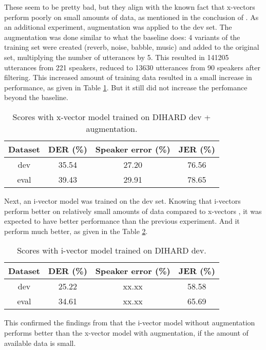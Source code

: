 		These seem to be pretty bad, but they align with the known fact that x-vectors perform poorly on small amounts of data, as mentioned in the conclusion of \cite{huang2018jhu}. As an additional experiment, augmentation was applied to the dev set. The augmentation was done similar to what the baseline does: 4 variants of the training set were created (reverb, noise, babble, music) and added to the original set, multiplying the number of utterances by 5. This resulted in 141205 utterances from 221 speakers, reduced to 13630 utterances from 90 speakers after filtering. This increased amount of training data resulted in a small increase in performance, as given in Table \ref{table-dev-xvec-aug}. But it still did not increase the perfomance beyond the baseline.
		
		\begin{table}[h]
			\centering
			\begin{tabular}{|c|c|c|c|}
				\hline
				Dataset & DER (\%) & Speaker error (\%) & JER (\%) \\
				\hline
				dev & 35.54 & 27.20 & 76.56 \\
				\hline
				eval & 39.43 & 29.91 & 78.65 \\
				\hline
			\end{tabular}
			\caption{Scores with x-vector model trained on DIHARD dev + augmentation.}
			\label{table-dev-xvec-aug}
		\end{table}
	
		Next, an i-vector model was trained on the dev set. Knowing that i-vectors perform better on relatively small amounts of data compared to x-vectors \cite{huang2018jhu}, it was expected to have better performance than the previous experiment. And it perform much better, as given in the Table \ref{table-dev-ivec}.
		
		\begin{table}[h]
			\centering
			\begin{tabular}{|c|c|c|c|}
				\hline
				Dataset & DER (\%) & Speaker error (\%) & JER (\%) \\
				\hline
				dev & 25.22 & xx.xx & 58.58 \\
				\hline
				eval & 34.61 & xx.xx & 65.69 \\
				\hline
			\end{tabular}
			\caption{Scores with i-vector model trained on DIHARD dev.}
			\label{table-dev-ivec}
		\end{table}
		
		This confirmed the findings from \cite{huang2018jhu} that the i-vector model without augmentation performs better than the x-vector model with augmentation, if the amount of available data is small.
		
